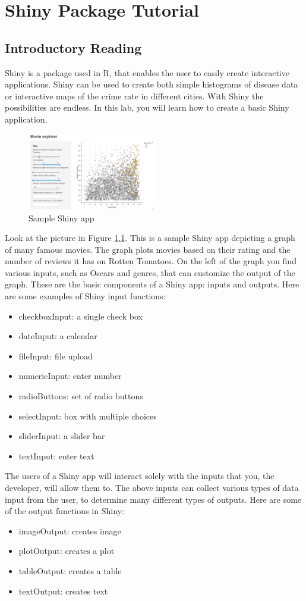 \chapter{Shiny Package Tutorial}
\section{Introductory Reading}

Shiny is a package used in R, that enables the user to easily create interactive applications.
Shiny can be used to create both simple histograms of disease data or interactive maps of the crime rate in different cities.
With Shiny the possibilities are endless.
In this lab, you will learn how to create a basic Shiny application. 
\begin{figure}
   \centering
   \includegraphics[width = 0.5\textwidth]{pictures/shiny/shiny.PNG} 
   \caption{Sample Shiny app}
   \label{fig:sampleapp}
\end{figure}
\noindent Look at the picture in Figure \ref{fig:sampleapp}.
\cite{gallery} This is a sample Shiny app depicting a graph of many famous movies.
The graph plots movies based on their rating and the number of reviews it has on Rotten Tomatoes.
On the left of the graph you find various inputs, such as Oscars and genres, that can customize the output of the graph.
These are the basic components of a Shiny app: inputs and outputs.     
Here are some examples of Shiny input functions:
\begin{itemize}
    \item checkboxInput: a single check box
    \item dateInput: a calendar
    \item fileInput: file upload
    \item numericInput: enter number
    \item radioButtons: set of radio buttons
    \item selectInput: box with multiple choices
    \item sliderInput: a slider bar
    \item textInput: enter text
\end{itemize}
\noindent The users of a Shiny app will interact solely with the inputs that you, the developer, will allow them to.
The above inputs can collect various types of data input from the user, to determine many different types of outputs.
Here are some of the output functions in Shiny:
\begin{itemize}
    \item imageOutput: creates image
    \item plotOutput: creates a plot
    \item tableOutput: creates a table
    \item textOutput: creates text
\end{itemize}

